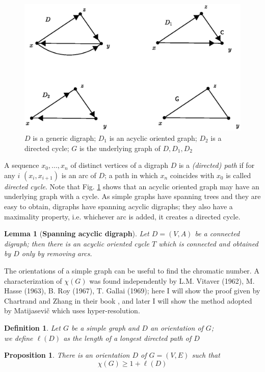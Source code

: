 \documentclass[a4paper,12pt,oneside]{book}
\newtheorem{proposition}[theorem]{Proposition}
\newtheorem{definition}[theorem]{Definition}
\newtheorem{lemma}[theorem]{Lemma}
\begin{document}
\begin{figure}[h]
\centering
\includegraphics[scale=0.55]{digraphs.eps}
\caption{$D$ is a generic digraph;
		$D_1$ is an acyclic oriented graph;
		$D_2$ is a directed cycle;
		$G$ is the underlying graph of $D,D_1,D_2$}\label{digraph}
\end{figure}


A sequence $x_0,...,x_n$ of distinct vertices of a digraph $D$ is a \textit{(directed) path} if for any $i$ $(x_i,x_{i+1})$ is an arc of $D$; a path in which $x_n$ coincides with $x_0$ is called \textit{directed cycle}. Note that Fig. \ref{digraph} shows that an acyclic oriented graph may have an underlying graph with a cycle. As simple graphs have spanning trees and they are easy to obtain, digraphs have spanning acyclic digraphs; they also have a maximality property, i.e. whichever arc is added, it creates a directed cycle.

\newpage
\begin{lemma}[\textbf{Spanning acyclic digraph}]
Let $D=(V,A)$ be a connected digraph; then there is an acyclic oriented cycle $T$ which is connected and obtained by $D$ only by removing arcs.
\end{lemma}

The orientations of a simple graph can be useful to find the chromatic number. A characterization of $\chi (G)$ was found independently by L.M. Vitaver \cite{vitaver}(1962), M. Hasse \cite{hasse}(1963), B. Roy \cite{roy}(1967), T. Gallai \cite{gallai}(1969); here I will show the proof given by Chartrand and Zhang in their book \cite{chrom}, and later I will show the method adopted by Matijasevi\v{c} \cite{mat-1} which uses hyper-resolution.
\begin{definition}\label{prova}
Let $G$ be a simple graph and $D$ an orientation of $G$;\\ we define $\ell (D)$ as the length of a longest directed path of $D$
\end{definition}
\begin{proposition}\label{prop-vitaver-easy}
There is an orientation $D$ of $G=(V,E)$ such that $$ \chi (G) \geq 1+\ell(D) $$
\end{proposition}
\end{document}
